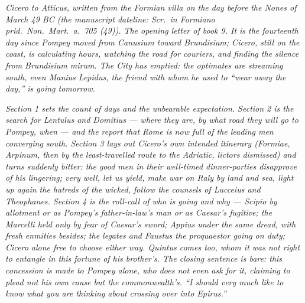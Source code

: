 
\textit{Cicero to Atticus, written from the Formian villa
on the day before the Nones of March 49 BC (the manuscript
dateline: \textit{Scr.\ in Formiano prid.\ Non.\ Mart.\ a.\
705 (49)}). The opening letter of book 9. It is the
fourteenth day since Pompey moved from Canusium toward
Brundisium; Cicero, still on the coast, is calculating
hours, watching the road for couriers, and finding the
silence from Brundisium \textit{mirum}. The City has
emptied: the optimates are streaming south, even Manius
Lepidus, the friend with whom he used to ``wear away the
day,'' is going tomorrow.}

\textit{Section 1 sets the count of days and the
unbearable expectation. Section 2 is the search for
Lentulus and Domitius --- where they are, by what road
they will go to Pompey, when --- and the report that
Rome is now full of the leading men converging south.
Section 3 lays out Cicero's own intended itinerary
(Formiae, Arpinum, then by the least-travelled route to
the Adriatic, lictors dismissed) and turns suddenly
bitter: the good men in their well-timed dinner-parties
disapprove of his lingering; very well, let us yield,
make war on Italy by land and sea, light up again the
hatreds of the wicked, follow the counsels of Lucceius
and Theophanes. Section 4 is the roll-call of who is
going and why --- Scipio by allotment or as Pompey's
father-in-law's man or as Caesar's fugitive; the
Marcelli held only by fear of Caesar's sword; Appius
under the same dread, with fresh enmities besides; the
legates and Faustus the proquaestor going on duty;
Cicero alone free to choose either way. Quintus comes
too, whom it was not right to entangle in this fortune
of his brother's. The closing sentence is bare: this
concession is made to Pompey alone, who does not even
ask for it, claiming to plead not his own cause but the
commonwealth's. ``I should very much like to know what
you are thinking about crossing over into Epirus.''}

